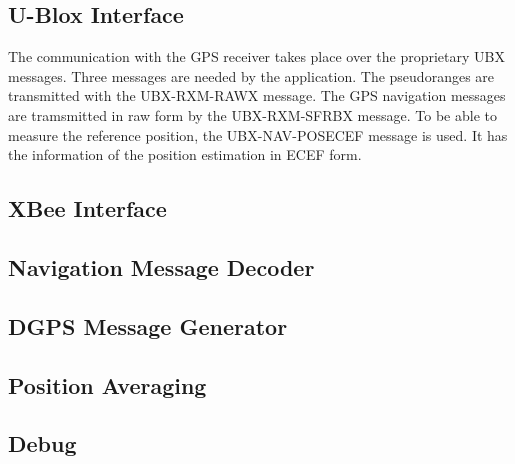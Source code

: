 \subsection{U-Blox Interface}

The communication with the GPS receiver takes place over the proprietary UBX messages.
Three messages are needed by the application.
The pseudoranges are transmitted with the UBX-RXM-RAWX message.
The GPS navigation messages are tramsmitted in raw form by the UBX-RXM-SFRBX message.
To be able to measure the reference position, the UBX-NAV-POSECEF message is used.
It has the information of the position estimation in ECEF form.


\subsection{XBee Interface}

\subsection{Navigation Message Decoder}

\subsection{DGPS Message Generator}

\subsection{Position Averaging}

\subsection{Debug}